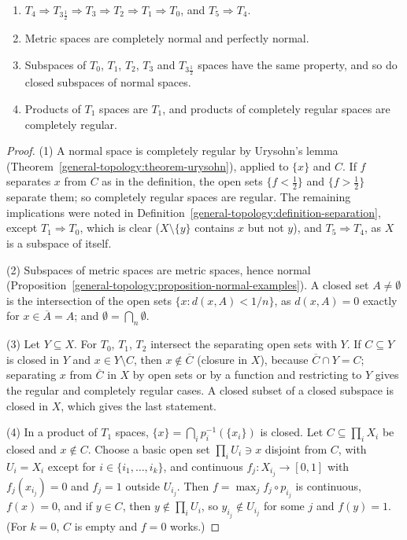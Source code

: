 \begin{proposition}\label{general-topology:proposition-separation-hierarchy}
\begin{enumerate}
\item $T_4 \Rightarrow T_{3\frac12} \Rightarrow T_3 \Rightarrow T_2 \Rightarrow T_1 \Rightarrow T_0$, and $T_5 \Rightarrow T_4$.
\item Metric spaces are completely normal and perfectly normal.
\item Subspaces of $T_0$, $T_1$, $T_2$, $T_3$ and $T_{3\frac12}$ spaces have the same property, and so do closed subspaces of normal spaces.
\item Products of $T_1$ spaces are $T_1$, and products of completely regular spaces are completely regular.
\end{enumerate}
\end{proposition}

\begin{proof}
(1) A normal space is completely regular by Urysohn's lemma (Theorem~\ref{general-topology:theorem-urysohn}), applied to $\{x\}$ and $C$. If $f$ separates $x$ from $C$ as in the definition, the open sets
$\{f < \frac12\}$ and $\{f > \frac12\}$ separate them; so completely regular spaces are regular. The remaining implications were noted in Definition~\ref{general-topology:definition-separation}, except
$T_1 \Rightarrow T_0$, which is clear ($X \setminus \{y\}$ contains $x$ but not $y$), and $T_5 \Rightarrow T_4$, as $X$ is a subspace of itself.

(2) Subspaces of metric spaces are metric spaces, hence normal (Proposition~\ref{general-topology:proposition-normal-examples}). A closed set $A \neq \emptyset$ is the intersection of the open sets
$\{x : d(x, A) < 1/n\}$, as $d(x, A) = 0$ exactly for $x \in \overline{A} = A$; and $\emptyset = \bigcap_n\emptyset$.

(3) Let $Y \subseteq X$. For $T_0$, $T_1$, $T_2$ intersect the separating open sets with $Y$. If $C \subseteq Y$ is closed in $Y$ and $x \in Y \setminus C$, then $x \notin \overline{C}$ (closure in $X$), because
$\overline{C} \cap Y = C$; separating $x$ from $\overline{C}$ in $X$ by open sets or by a function and restricting to $Y$ gives the regular and completely regular cases. A closed subset of a closed subspace
is closed in $X$, which gives the last statement.

(4) In a product of $T_1$ spaces, $\{x\} = \bigcap_ip_i^{-1}(\{x_i\})$ is closed. Let $C \subseteq \prod_iX_i$ be closed and $x \notin C$. Choose a basic open set $\prod_iU_i \ni x$ disjoint from $C$, with $U_i = X_i$
except for $i \in \{i_1, \ldots, i_k\}$, and continuous $f_j \colon X_{i_j} \to [0, 1]$ with $f_j(x_{i_j}) = 0$ and $f_j = 1$ outside $U_{i_j}$. Then $f = \max_jf_j \circ p_{i_j}$ is continuous, $f(x) = 0$, and if $y \in C$,
then $y \notin \prod_iU_i$, so $y_{i_j} \notin U_{i_j}$ for some $j$ and $f(y) = 1$. (For $k = 0$, $C$ is empty and $f = 0$ works.)
\end{proof}

